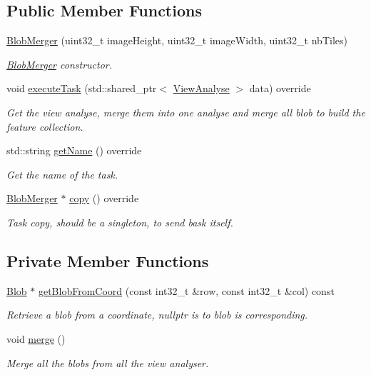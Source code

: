 \subsection*{Public Member Functions}
\begin{DoxyCompactItemize}
\item 
\hyperlink{classfc_1_1BlobMerger_a6304048cc051fa0401bb998b15bac73d}{Blob\+Merger} (uint32\+\_\+t image\+Height, uint32\+\_\+t image\+Width, uint32\+\_\+t nb\+Tiles)
\begin{DoxyCompactList}\small\item\em \hyperlink{classfc_1_1BlobMerger}{Blob\+Merger} constructor. \end{DoxyCompactList}\item 
void \hyperlink{classfc_1_1BlobMerger_a81af854864e9ae220ad7c5fed0eef195}{execute\+Task} (std\+::shared\+\_\+ptr$<$ \hyperlink{classfc_1_1ViewAnalyse}{View\+Analyse} $>$ data) override
\begin{DoxyCompactList}\small\item\em Get the view analyse, merge them into one analyse and merge all blob to build the feature collection. \end{DoxyCompactList}\item 
std\+::string \hyperlink{classfc_1_1BlobMerger_a5b14aeeae9e03ceee8fdd90d2828a1bb}{get\+Name} () override
\begin{DoxyCompactList}\small\item\em Get the name of the task. \end{DoxyCompactList}\item 
\hyperlink{classfc_1_1BlobMerger}{Blob\+Merger} $\ast$ \hyperlink{classfc_1_1BlobMerger_a71cdaa2d3b28253922f0e43d911003ca}{copy} () override
\begin{DoxyCompactList}\small\item\em Task copy, should be a singleton, to send bask itself. \end{DoxyCompactList}\end{DoxyCompactItemize}
\subsection*{Private Member Functions}
\begin{DoxyCompactItemize}
\item 
\hyperlink{classfc_1_1Blob}{Blob} $\ast$ \hyperlink{classfc_1_1BlobMerger_ac2e61560c60b1467e385a3d08577c650}{get\+Blob\+From\+Coord} (const int32\+\_\+t \&row, const int32\+\_\+t \&col) const
\begin{DoxyCompactList}\small\item\em Retrieve a blob from a coordinate, nullptr is to blob is corresponding. \end{DoxyCompactList}\item 
void \hyperlink{classfc_1_1BlobMerger_a11fa980b355aa46271460f33a5cce0ac}{merge} ()
\begin{DoxyCompactList}\small\item\em Merge all the blobs from all the view analyser. \end{DoxyCompactList}\end{DoxyCompactItemize}
